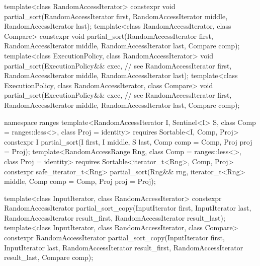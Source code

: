 \begin{codeblock}
  template<class RandomAccessIterator>
    constexpr void partial_sort(RandomAccessIterator first,
                                RandomAccessIterator middle,
                                RandomAccessIterator last);
  template<class RandomAccessIterator, class Compare>
    constexpr void partial_sort(RandomAccessIterator first,
                                RandomAccessIterator middle,
                                RandomAccessIterator last, Compare comp);
  template<class ExecutionPolicy, class RandomAccessIterator>
    void partial_sort(ExecutionPolicy&& exec, // see 
                      RandomAccessIterator first,
                      RandomAccessIterator middle,
                      RandomAccessIterator last);
  template<class ExecutionPolicy, class RandomAccessIterator, class Compare>
    void partial_sort(ExecutionPolicy&& exec, // see 
                      RandomAccessIterator first,
                      RandomAccessIterator middle,
                      RandomAccessIterator last, Compare comp);
\end{codeblock}\begin{addedblock}\begin{codeblock}
  namespace ranges {
    template<RandomAccessIterator I, Sentinel<I> S, class Comp = ranges::less<>,
        class Proj = identity>
      requires Sortable<I, Comp, Proj>
      constexpr I
        partial_sort(I first, I middle, S last, Comp comp = Comp{}, Proj proj = Proj{});
    template<RandomAccessRange Rng, class Comp = ranges::less<>, class Proj = identity>
      requires Sortable<iterator_t<Rng>, Comp, Proj>
      constexpr safe_iterator_t<Rng>
        partial_sort(Rng&& rng, iterator_t<Rng> middle, Comp comp = Comp{},
                     Proj proj = Proj{});
  }
\end{codeblock}\end{addedblock}\begin{codeblock}
  template<class InputIterator, class RandomAccessIterator>
    constexpr RandomAccessIterator
      partial_sort_copy(InputIterator first, InputIterator last,
                        RandomAccessIterator result_first,
                        RandomAccessIterator result_last);
  template<class InputIterator, class RandomAccessIterator, class Compare>
    constexpr RandomAccessIterator
      partial_sort_copy(InputIterator first, InputIterator last,
                        RandomAccessIterator result_first,
                        RandomAccessIterator result_last,
                        Compare comp);

\end{codeblock}
